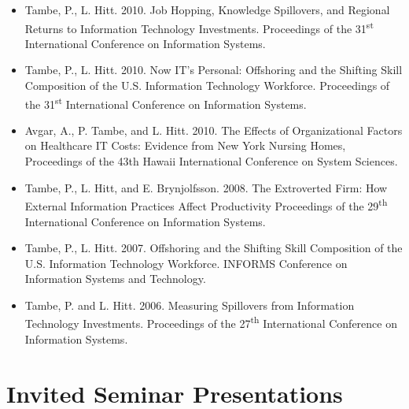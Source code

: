 \documentclass[10pt,letterpaper]{article}
\begin{document}
\begin{itemize}
\item Tambe, P., L. Hitt. 2010. Job Hopping, Knowledge Spillovers, and Regional Returns to Information Technology Investments. Proceedings of the 31\textsuperscript{st} International Conference on Information Systems.

\item Tambe, P., L. Hitt.  2010. Now IT's Personal: Offshoring and the Shifting Skill Composition of the U.S. Information Technology Workforce. Proceedings of the 31\textsuperscript{st} International Conference on Information Systems.

\item Avgar, A., P. Tambe, and L. Hitt. 2010. The Effects of Organizational Factors on Healthcare IT Costs: Evidence from New York Nursing Homes, Proceedings of the 43th Hawaii International Conference on System Sciences.

\item Tambe, P., L. Hitt, and E. Brynjolfsson. 2008. The Extroverted Firm: How External Information Practices Affect Productivity Proceedings of the 29\textsuperscript{th} International Conference on Information Systems.

\item Tambe, P., L. Hitt.  2007. Offshoring and the Shifting Skill Composition of the U.S. Information Technology Workforce. INFORMS Conference on Information Systems and Technology.

\item Tambe, P. and L. Hitt. 2006. Measuring Spillovers from Information Technology Investments. Proceedings of the 27\textsuperscript{th} International Conference on Information Systems.
\end{itemize}

\section*{Invited Seminar Presentations}
\end{document}
